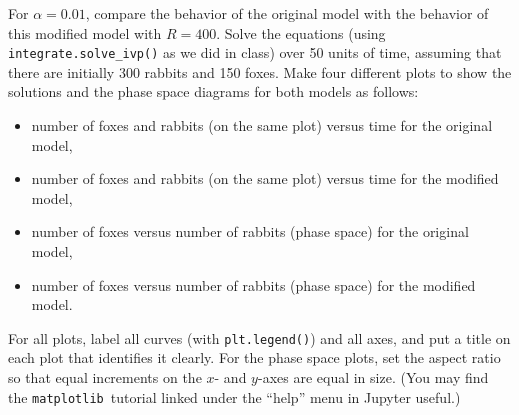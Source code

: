 \documentclass[11pt]{article}
\newcommand{\matplotlib}{{\tt matplotlib}}  %
\begin{document}
For $\alpha = 0.01$, compare the behavior of the original model
with the behavior of this modified model with $R = 400$.
Solve the equations (using {\tt integrate.solve\_ivp()} as we did in class)
over 50 units of time, 
assuming that there are initially 300 rabbits and 150 foxes.
Make four different plots to show the solutions and the phase
space diagrams for both models as follows:
\begin{itemize}
\item number of foxes and rabbits (on the same plot) versus time for the original model,
\item number of foxes and rabbits (on the same plot) versus time for the modified model,
\item number of foxes versus number of rabbits (phase space) for the original model,
\item number of foxes versus number of rabbits (phase space) for the modified model.
\end{itemize}
For all plots, label all curves (with {\tt plt.legend()}) and all axes,
and put a title on each plot that identifies it clearly.
For the phase space plots, set the aspect
ratio so that equal increments on the $x$- and $y$-axes are equal in size.
(You may find the \matplotlib\ tutorial linked under the ``help'' menu
in Jupyter useful.)
\end{document}
